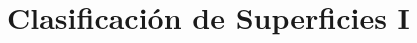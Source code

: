 \documentclass[GTSResumen.tex]{subfiles}
\begin{document}

\renewcommand\chaptername{\Huge Tema}

\titleformat{\chapter}[display]
    {\normalfont\huge\bfseries}{\chaptertitlename\ \thechapter}{10pt}{\Huge}
\titlespacing*{\chapter}{0pt}{-1cm}{10pt}

  

\setcounter{chapter}{1}

\chapter{Clasificación de Superficies I}
\begin{comment}
En topología, clasificar la familia de espacios que cumplen una propiedad topológica (es decir, invariante por homeomorfismos) $P$ consiste en alcanzar los siguientes objetivos:
\begin{enumerate}
\item[$\circled{1}$] Encontrar modelos $X_1,\dots,X_n,\dots$ de forma que todo espacio topológico con la propiedad $P$ es homeomorfo a algún $X_i$.
\item[$\circled{2}$] Dar un método de ``distinguibilidad", es decir, un procedimiento o técnica que distinga cuándo dos espacios $X$ e $Y$ con la propiedad $P$ \underline{no} son homemorfos. Para ello, bastará distinguir los modelos $X_i$.
\end{enumerate}
Algunas de las propiedades conocidas desde el curso de Topología de 1º son:
\begin{itemize}
\item Compacidad.
\item Conexión.
\item Número de componentes conexas (por caminos).
\item Número y orden de puntos de corte.
\end{itemize}
\end{comment}
\end{document}
